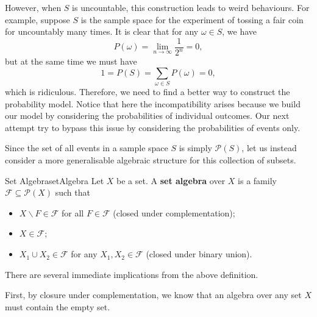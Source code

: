 \documentclass[math]{amznotes}
\theoremstyle{remark}
\newcommand{\0}{\mathbf{0}}
\newcommand{\1}{\mathbf{1}}
\begin{document}
However, when $S$ is uncountable, this construction leads to weird behaviours. For example, suppose $S$ is the sample space for the experiment of tossing a fair coin for uncountably many times. It is clear that for any $\omega \in S$, we have 
\begin{equation*}
    P\left(\omega\right) = \lim_{n \to \infty}\frac{1}{2^{n}} = 0,
\end{equation*}
but at the same time we must have 
\begin{equation*}
    1 = P\left(S\right) = \sum_{\omega \in S}P\left(\omega\right) = 0,
\end{equation*}
which is ridiculous. Therefore, we need to find a better way to construct the probability model. Notice that here the incompatibility arises because we build our model by considering the probabilities of individual outcomes. Our next attempt try to bypass this issue by considering the probabilities of events only.

Since the set of all events in a sample space $S$ is simply $\mathcal{P}\left(S\right)$, let us instead consider a more generalisable algebraic structure for this collection of subsets.
\begin{dfnbox}{Set Algebra}{setAlgebra}
    Let $X$ be a set. A {\color{red} \textbf{set algebra}} over $X$ is a family $\mathcal{F} \subseteq \mathcal{P}\left(X\right)$ such that 
    \begin{itemize}
        \item $X \backslash F \in \mathcal{F}$ for all $F \in \mathcal{F}$ (closed under complementation);
        \item $X \in \mathcal{F}$;
        \item $X_1 \cup X_2 \in \mathcal{F}$ for any $X_1, X_2 \in \mathcal{F}$ (closed under binary union).
    \end{itemize}
\end{dfnbox}
There are several immediate implications from the above definition. 

First, by closure under complementation, we know that an algebra over any set $X$ must contain the empty set. 
\end{document}
